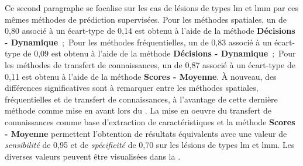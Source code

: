 Ce second paragraphe se focalise sur les cas de lésions de types \gls{lm} et \gls{lmm} par ces mêmes méthodes de prédiction supervisées. Pour les méthodes spatiales, un \fscore{} de 0,80 associé à un écart-type de 0,14 est obtenu à l'aide de la méthode \textbf{Décisions - Dynamique}~;~Pour les méthodes fréquentielles, un \fscore{} de 0,83 associé à un écart-type de 0,09 est obtenu à l'aide de la méthode \textbf{Décisions - Dynamique}~;~Pour les méthodes de transfert de connaissances, un \fscore{} de 0,87 associé à un écart-type de 0,11 est obtenu à l'aide de la méthode \textbf{Scores - Moyenne}. À nouveau, des différences significatives sont à remarquer entre les méthodes spatiales, fréquentielles et de transfert de connaissances, à l'avantage de cette dernière méthode comme mise en avant lors du . La mise en oeuvre du transfert de connaissances comme base d'extraction de caractéristiques et la méthode \textbf{Scores - Moyenne} permettent l'obtention de résultats équivalents avec une valeur de \textit{sensibilité} de 0,95 et de \textit{spécificité} de 0,70 sur les lésions de types \gls{lm} et \gls{lmm}. Les diverses valeurs peuvent être visualisées dans la .\par

